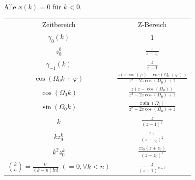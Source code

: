 \documentclass[10pt,a4paper]{article}
\begin{document}
Alle $x(k)=0$ für $k < 0$.
\begin{center}
  \bgroup
  \def\arraystretch{1.5}
  \begin{tabular}{ | c | c | }
  \cline{1-2}
          \rowcolor{black!15}
          Zeitbereich & Z-Bereich \\
  
  \cline{1-2}
          $\gamma_0(k)$ &
          $1$ \\

  \cline{1-2}
          $z_0^k$ & $\frac{z}{z-z_0}$ \\

  \cline{1-2}
          $\gamma_{-1}(k)$ & $\frac{z}{z-1}$\\

  \cline{1-2}
        $\cos(\Omega_0k+\varphi)$ & $\frac{z(z\cos(\varphi)-cos(\Omega_0+\varphi))}{z^2-2z\cos(\Omega_0)+1}$ \\ 

  \cline{1-2}
          $\cos(\Omega_0k)$ & $\frac{z(z-\cos(\Omega_0))}{z^2-2z\cos(\Omega_0)+1}$ \\ 
  
  \cline{1-2}
          $\sin(\Omega_0k)$ & $\frac{z\sin(\Omega_0)}{z^2-2z\cos(\Omega_0)+1}$ \\  
  
  \cline{1-2}
          $k$ & $\frac{z}{(z-1)^2}$ \\ 

  \cline{1-2}
          $kz_0^k$ & $\frac{zz_0}{(z-z_0)^2}$\\ 

  \cline{1-2}
          $k^2z_0^k$ & $\frac{zz_0(z+z_0)}{(z-z_0)^3}$ \\  

  \cline{1-2}
          \shortstack{$\binom{k}{n}=\frac{k!}{(k-n)!n!}$ \\ $(=0, \forall{}k<n)$} & $\frac{z}{(z-1)^{n+1}}$ \\
  
  \cline{1-2}
  \end{tabular}
  \egroup
\end{center}
\end{document}

